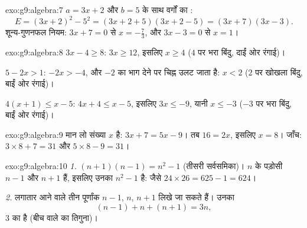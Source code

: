 \begin{solution}{exo:g9:algebra:7}
$a = 3x + 2$ और $b = 5$ के साथ वर्गों का :
\[
E = (3x + 2)^2 - 5^2 = (3x + 2 + 5)(3x + 2 - 5) = (3x + 7)(3x - 3).
\]
शून्य-गुणनफल नियम: $3x + 7 = 0$ से $x = -\frac73$, और $3x - 3 = 0$ से
$x = 1$।
\end{solution}

\begin{solution}{exo:g9:algebra:8}
$3x - 4 \geq 8$: $3x \geq 12$, इसलिए $x \geq 4$ ($4$ पर भरा बिंदु,
दाईं ओर रंगाई)।

$5 - 2x > 1$: $-2x > -4$, और $-2$ का भाग देने पर चिह्न उलट जाता है:
$x < 2$ ($2$ पर खोखला बिंदु, बाईं ओर रंगाई)।

$4(x+1) \leq x - 5$: $4x + 4 \leq x - 5$, इसलिए $3x \leq -9$, यानी
$x \leq -3$ ($-3$ पर भरा बिंदु, बाईं ओर रंगाई)।
\end{solution}

\begin{solution}{exo:g9:algebra:9}
मान लो संख्या $x$ है: $3x + 7 = 5x - 9$। तब $16 = 2x$, इसलिए $x = 8$।
जाँच: $3 \times 8 + 7 = 31$ और $5 \times 8 - 9 = 31$।
\end{solution}

\begin{solution}{exo:g9:algebra:10}
\emph{1.} $(n+1)(n-1) = n^2 - 1$ (तीसरी सर्वसमिका)। $n$ के पड़ोसी
$n - 1$ और $n + 1$ हैं, इसलिए उनका  $n^2 - 1$ है: जैसे
$24 \times 26 = 625 - 1 = 624$।

\emph{2.} लगातार आने वाले तीन पूर्णांक $n - 1$, $n$, $n + 1$ लिखे जा
सकते हैं। उनका 
\[
(n-1) + n + (n+1) = 3n ,
\]
$3$ का  है (बीच वाले का तिगुना)।
\end{solution}


